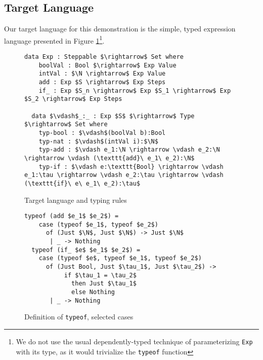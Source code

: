\documentclass[manuscript,screen,review,sigplan]{acmart}
\begin{document}
\subsection{Target Language}

Our target language for this demonstration is the simple, typed expression
language presented in Figure \ref{lang}\footnote{We do not use the usual
dependently-typed technique of parameterizing \texttt{Exp} with its type, as it
would trivialize the \texttt{typeof} function}.

\begin{figure}[htbp]
  \begin{lstlisting}[basicstyle=\small\ttfamily]
  data Exp : Steppable $\rightarrow$ Set where
    boolVal : Bool $\rightarrow$ Exp Value
    intVal : $\N \rightarrow$ Exp Value
    add : Exp $S \rightarrow$ Exp Steps
    if_ : Exp $S_n \rightarrow$ Exp $S_1 \rightarrow$ Exp $S_2 \rightarrow$ Exp Steps
    
  data $\vdash$_:_ : Exp $S$ $\rightarrow$ Type $\rightarrow$ Set where
    typ-bool : $\vdash$(boolVal b):Bool
    typ-nat : $\vdash$(intVal i):$\N$
    typ-add : $\vdash e_1:\N \rightarrow \vdash e_2:\N \rightarrow \vdash (\texttt{add}\ e_1\ e_2):\N$
    typ-if : $\vdash e:\texttt{Bool} \rightarrow \vdash e_1:\tau \rightarrow \vdash e_2:\tau \rightarrow \vdash (\texttt{if}\ e\ e_1\ e_2):\tau$
  \end{lstlisting}
  \caption{Target language and typing rules}
  \label{lang}
\end{figure}

\begin{figure}[htbp]
  \begin{lstlisting}[basicstyle=\small\ttfamily]
  typeof (add $e_1$ $e_2$) =
    case (typeof $e_1$, typeof $e_2$)
      of (Just $\N$, Just $\N$) -> Just $\N$
       | _ -> Nothing
  typeof (if_ $e$ $e_1$ $e_2$) =
    case (typeof $e$, typeof $e_1$, typeof $e_2$)
      of (Just Bool, Just $\tau_1$, Just $\tau_2$) ->
           if $\tau_1 = \tau_2$
             then Just $\tau_1$
             else Nothing
       | _ -> Nothing
  \end{lstlisting}
  \caption{Definition of \texttt{typeof}, selected cases
    \protect\footnotemark}\label{def:typeof}
\end{figure}

\end{document}
